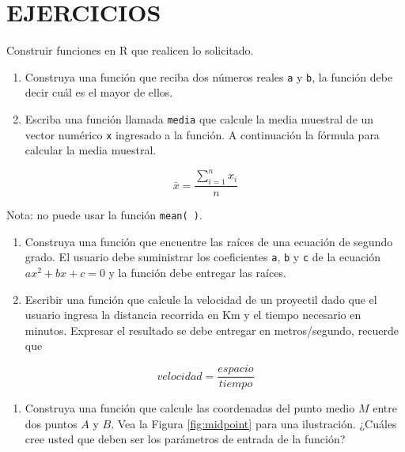 \documentclass[10pt,]{krantz}
\providecommand{\tightlist}{%
  \setlength{\itemsep}{0pt}\setlength{\parskip}{0pt}}
\let\proglang=\textsf
\begin{document}
\section*{EJERCICIOS}\label{ejercicios-2}


Construir funciones en \proglang{R} que realicen lo solicitado.

\begin{enumerate}
\def\labelenumi{\arabic{enumi}.}
\item
  Construya una función que reciba dos números reales \texttt{a} y
  \texttt{b}, la función debe decir cuál es el mayor de ellos.
\item
  Escriba una función llamada \texttt{media} que calcule la media
  muestral de un vector numérico \texttt{x} ingresado a la función. A
  continuación la fórmula para calcular la media muestral.
\end{enumerate}

\[\bar{x}=\frac{\sum_{i=1}^n x_i}{n}\]

Nota: no puede usar la función \texttt{mean(\ )}.

\begin{enumerate}
\def\labelenumi{\arabic{enumi}.}
\setcounter{enumi}{2}
\item
  Construya una función que encuentre las raíces de una ecuación de
  segundo grado. El usuario debe suministrar los coeficientes
  \texttt{a}, \texttt{b} y \texttt{c} de la ecuación \(ax^2+bx+c=0\) y
  la función debe entregar las raíces.
\item
  Escribir una función que calcule la velocidad de un proyectil dado que
  el usuario ingresa la distancia recorrida en Km y el tiempo necesario
  en minutos. Expresar el resultado se debe entregar en metros/segundo,
  recuerde que
\end{enumerate}

\[velocidad = \frac{espacio}{tiempo}\]

\begin{enumerate}
\def\labelenumi{\arabic{enumi}.}
\setcounter{enumi}{4}
\tightlist
\item
  Construya una función que calcule las coordenadas del punto medio
  \(M\) entre dos puntos \(A\) y \(B\). Vea la Figura \ref{fig:midpoint}
  para una ilustración. ¿Cuáles cree usted que deben ser los parámetros
  de entrada de la función?
\end{enumerate}
\end{document}
